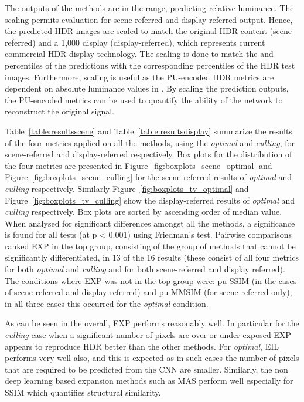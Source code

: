 \documentclass{egpubl}
\newcommand{\tc}[1]{{#1}}
\begin{document}
The outputs of the methods are in the  range, predicting relative
luminance. The scaling permits evaluation for scene-referred and
display-referred output. Hence, the predicted HDR images are scaled to match
the original HDR content (scene-referred) and a 1,000  display
(display-referred), which represents current commercial HDR display technology.
The scaling is done to match the  and  percentiles of the
predictions with the corresponding percentiles of the HDR test images.
Furthermore, scaling is useful as the PU-encoded HDR metrics are dependent on
absolute luminance values in . By scaling the prediction outputs, the
PU-encoded metrics can be used to quantify the ability of the network to
reconstruct the original signal.

Table~\ref{table:resultsscene} and Table~\ref{table:resultsdisplay} summarize
the results of the four metrics applied on all the methods, using the
\textit{optimal} and \textit{culling}, for scene-referred and display-referred
respectively. Box plots for the distribution of the four metrics are presented
in Figure~\ref{fig:boxplots_scene_optimal} and
Figure~\ref{fig:boxplots_scene_culling} for the scene-referred results of
\textit{optimal} and \textit{culling} respectively. Similarly
Figure~\ref{fig:boxplots_tv_optimal} and Figure~\ref{fig:boxplots_tv_culling}
show the display-referred results of \textit{optimal} and \textit{culling}
respectively. Box plots are sorted by ascending order of median value.
\tc{When analysed for significant differences amongst all the methods, a
significance is found for all tests (at p < 0.001) using Friedman's test.
Pairwise comparisons ranked EXP in the top group, consisting of the group of
methods that cannot be significantly differentiated, in 13 of the 16 results
(these consist of all four metrics for both \textit{optimal} and
\textit{culling} and for both scene-referred and display referred). The
conditions where EXP was not in the top group were: pu-SSIM (in the cases of
scene-referred and display-referred) and pu-MMSIM (for scene-referred only); in
all three cases this occurred for the \textit{optimal} condition.}

As can be seen in the overall, EXP performs reasonably well. In particular for
the \textit{culling} case when a significant number of pixels are over or
under-exposed EXP appears to reproduce HDR better than the other methods. For
\textit{optimal}, EIL performs very well also, and this is expected as in such
cases the number of pixels that are required to be predicted from the CNN are
smaller. Similarly, the non deep learning based expansion methods such as MAS
perform well especially for SSIM which quantifies structural similarity.
\end{document}
